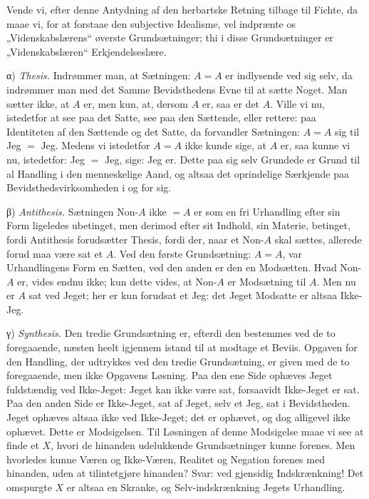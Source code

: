 \documentclass[12pt]{book}
\newcommand{\opage}[1]{\marginnote{\footnotesize\textit{[#1]}}}
\begin{document}
Vende vi, efter denne Antydning af den herbartske Retning tilbage til Fichte, da
maae vi, for at forstaae den subjective Idealisme, vel indprænte os
„Videnskabslærens“ øverste Grundsætninger; thi i disse Grundsætninger er
„Videnskabslæren“ Erkjendelseslære.

α) \emph{Thesis.} Indrømmer man, at Sætningen: $A = A$ er indlysende ved sig selv,
da indrømmer man med det Samme Bevidsthedens Evne til at sætte Noget. Man sætter
ikke, at $A$ er, men kun, at, dersom $A$ er, saa er det $A$.
\opage{35} Ville vi nu, istedetfor at see paa det Satte, see paa den Sættende, eller rettere:
paa Identiteten af den Sættende og det Satte, da forvandler Sætningen: $A = A$ sig
til Jeg $=$ Jeg. Medens vi istedetfor $A = A$ ikke kunde sige, at $A$ er, saa kunne
vi nu, istedetfor: Jeg $=$ Jeg, sige: Jeg er. Dette paa sig selv Grundede er Grund
til al Handling i den menneskelige Aand, og altsaa det oprindelige Særkjende paa
Bevidsthedsvirksomheden i og for sig.

β) \emph{Antithesis.} Sætningen Non-$A$ ikke $=A$ er som en fri Urhandling efter sin
Form ligeledes ubetinget, men derimod efter sit Indhold, sin Materie, betinget,
fordi Antithesis forudsætter Thesis, fordi der, naar et Non-$A$ skal sættes,
allerede forud maa være sat et $A$. Ved den første Grundsætning: $A = A$, var
Urhandlingens Form en Sætten, ved den anden er den en Modsætten. Hvad Non-$A$ er,
vides endnu ikke; kun dette vides, at Non-$A$ er Modsætning til $A$. Men nu er $A$
sat ved Jeget; her er kun forudsat et Jeg: det Jeget Modsatte er altsaa Ikke-Jeg.

γ) \emph{Synthesis.} Den tredie Grundsætning er, efterdi den bestemmes ved de to
foregaaende, næsten heelt igjennem istand til at modtage et Beviis. Opgaven for den
Handling, der udtrykkes ved den tredie Grundsætning, er given med de to foregaaende,
men ikke Opgavens Løsning. Paa den ene Side ophæves Jeget fuldstændig ved
Ikke-Jeget: Jeget kan ikke være sat, forsaavidt Ikke-Jeget er sat. Paa den anden
Side er Ikke-Jeget, sat af Jeget, selv et Jeg, sat i Bevidstheden. Jeget ophæves
altsaa ikke ved Ikke-Jeget; det er ophævet, og dog alligevel ikke ophævet. Dette er
Modsigelsen. Til Løsningen af denne Modsigelse maae vi see at finde et $X$, hvori de
hinanden udelukkende Grundsætninger kunne forenes. Men hvorledes kunne Væren og
Ikke-Væren, Realitet og Negation forenes med hinanden, uden at tilintetgjøre
hinanden? Svar: ved gjensidig Indskrænkning! Det omspurgte $X$ er altsaa en Skranke,
og Selv-indskrænkning Jegets Urhandling.
\end{document}
